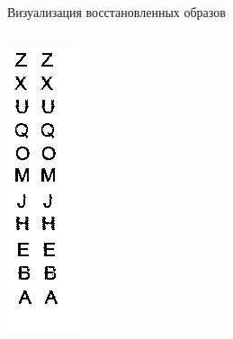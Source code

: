 \documentclass[10pt]{beamer}
\begin{document}
\begin{frame}{Визуализация восстановленных образов}

\begin{columns}
    \includegraphics[width=1\textwidth]{images/rec1.png}

\end{columns}
\end{frame}
\end{document}
